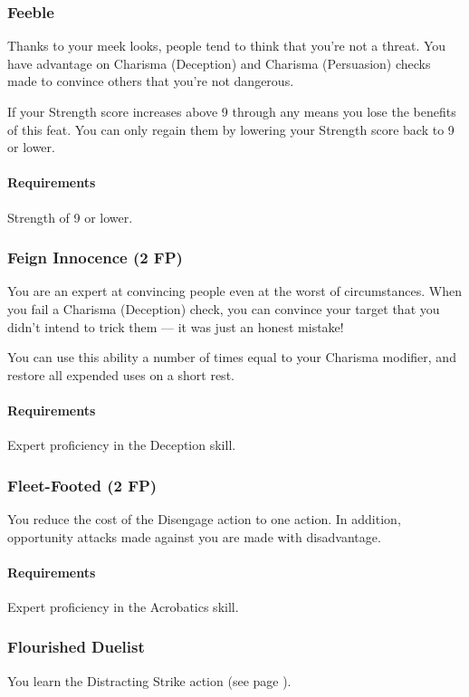 \subsubsection{Feeble} \label{feat::feeble}
    Thanks to your meek looks, people tend to think that you're not a threat.
    You have advantage on Charisma (Deception) and Charisma (Persuasion) checks made to convince others that you're not dangerous.

    If your Strength score increases above 9 through any means you lose the benefits of this feat.
    You can only regain them by lowering your Strength score back to 9 or lower.
    \paragraph{Requirements} Strength of 9 or lower.
\subsubsection{Feign Innocence (2 FP)} \label{feat::feigninnocence}
    You are an expert at convincing people even at the worst of circumstances.
    When you fail a Charisma (Deception) check, you can convince your target that you didn't intend to trick them --- it was just an honest mistake!

    You can use this ability a number of times equal to your Charisma modifier, and restore all expended uses on a short rest.
    \paragraph{Requirements} Expert proficiency in the Deception skill.
\subsubsection{Fleet-Footed (2 FP)} \label{feat::fleetfooted}
    You reduce the cost of the Disengage action to one action.
    In addition, opportunity attacks made against you are made with disadvantage.
    \paragraph{Requirements} Expert proficiency in the Acrobatics skill.
\subsubsection{Flourished Duelist} \label{feat::flourishedduelist}
    You learn the Distracting Strike action (see page \pageref{act::distractingstrike}).
